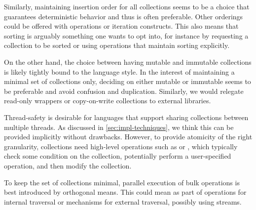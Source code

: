 \documentclass[sigconf, authorversion]{acmart}
\begin{document}
\label{sec:insertion-ordering-choice}
Similarly, maintaining insertion order for all collections seems to be a choice
that guarantees deterministic behavior and thus is often preferable.
Other orderings could be offered with operations or iteration constructs.
This also means that sorting is arguably something one wants to opt into,
for instance by requesting a collection to be sorted or using operations that
maintain sorting explicitly.

On the other hand, the choice between having mutable and immutable collections is likely tightly
bound to the language style.
In the interest of maintaining a minimal set of collections only,
deciding on either mutable or immutable seems to be preferable and avoid confusion and duplication.
Similarly, we would relegate read-only wrappers or copy-on-write collections
to external libraries.

\label{sec:design-thread-safety}
Thread-safety is desirable for languages
that support sharing collections between multiple threads.
As discussed in \cref{sec:impl-techniques},
we think this can be provided implicitly without drawbacks.
However, to provide atomicity of the right granularity,
collections need high-level operations
such as  or ,
which typically check some condition on the collection,
potentially perform a user-specified operation, and then modify the collection.


To keep the set of collections minimal,
parallel execution of bulk operations is
best introduced by orthogonal means.
This could mean as part of operations for internal traversal
or mechanisms for external traversal, possibly using streams.
\end{document}
